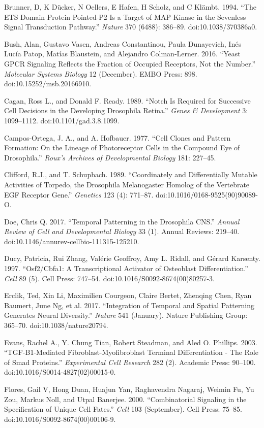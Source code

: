 Brunner, D, K Dücker, N Oellers, E Hafen, H Scholz, and C Klämbt. 1994. ``The ETS Domain Protein Pointed-P2 Is a Target of MAP Kinase in the Sevenless Signal Transduction Pathway.'' \emph{Nature} 370 (6488): 386--89. doi:10.1038/370386a0.

Bush, Alan, Gustavo Vasen, Andreas Constantinou, Paula Dunayevich, Inés Lucía Patop, Matías Blaustein, and Alejandro Colman‐Lerner. 2016. ``Yeast GPCR Signaling Reflects the Fraction of Occupied Receptors, Not the Number.'' \emph{Molecular Systems Biology} 12 (December). EMBO Press: 898. doi:10.15252/msb.20166910.

Cagan, Ross L., and Donald F. Ready. 1989. ``Notch Is Required for Successive Cell Decisions in the Developing Drosophila Retina.'' \emph{Genes \& Development} 3: 1099--1112. doi:10.1101/gad.3.8.1099.

Campos-Ortega, J. A., and A. Hofbauer. 1977. ``Cell Clones and Pattern Formation: On the Lineage of Photoreceptor Cells in the Compound Eye of Drosophila.'' \emph{Roux's Archives of Developmental Biology} 181: 227--45.

Clifford, R.J., and T. Schupbach. 1989. ``Coordinately and Differentially Mutable Activities of Torpedo, the Drosophila Melanogaster Homolog of the Vertebrate EGF Receptor Gene.'' \emph{Genetics} 123 (4): 771--87. doi:10.1016/0168-9525(90)90089-O.

Doe, Chris Q. 2017. ``Temporal Patterning in the Drosophila CNS.'' \emph{Annual Review of Cell and Developmental Biology} 33 (1). Annual Reviews: 219--40. doi:10.1146/annurev-cellbio-111315-125210.

Ducy, Patricia, Rui Zhang, Valérie Geoffroy, Amy L. Ridall, and Gérard Karsenty. 1997. ``Osf2/Cbfa1: A Transcriptional Activator of Osteoblast Differentiation.'' \emph{Cell} 89 (5). Cell Press: 747--54. doi:10.1016/S0092-8674(00)80257-3.

Erclik, Ted, Xin Li, Maximilien Courgeon, Claire Bertet, Zhenqing Chen, Ryan Baumert, June Ng, et al. 2017. ``Integration of Temporal and Spatial Patterning Generates Neural Diversity.'' \emph{Nature} 541 (January). Nature Publishing Group: 365--70. doi:10.1038/nature20794.

Evans, Rachel A., Y. Chung Tian, Robert Steadman, and Aled O. Phillips. 2003. ``TGF-Β1-Mediated Fibroblast-Myofibroblast Terminal Differentiation - The Role of Smad Proteins.'' \emph{Experimental Cell Research} 282 (2). Academic Press: 90--100. doi:10.1016/S0014-4827(02)00015-0.

Flores, Gail V, Hong Duan, Huajun Yan, Raghavendra Nagaraj, Weimin Fu, Yu Zou, Markus Noll, and Utpal Banerjee. 2000. ``Combinatorial Signaling in the Specification of Unique Cell Fates.'' \emph{Cell} 103 (September). Cell Press: 75--85. doi:10.1016/S0092-8674(00)00106-9.

